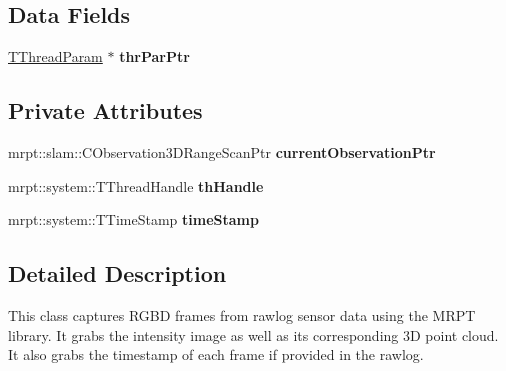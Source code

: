 \subsection*{Data Fields}
\begin{DoxyCompactItemize}
\item 
\hypertarget{class_kinect_grabber___rawlog_a7aa6e56a18c9090f2b3009ab691a4850}{
\hyperlink{struct_kinect_grabber___rawlog_1_1_t_thread_param}{TThreadParam} $\ast$ {\bfseries thrParPtr}}
\label{class_kinect_grabber___rawlog_a7aa6e56a18c9090f2b3009ab691a4850}

\end{DoxyCompactItemize}
\subsection*{Private Attributes}
\begin{DoxyCompactItemize}
\item 
\hypertarget{class_kinect_grabber___rawlog_a0f4c2d06f54de46bbe64df6435982b87}{
mrpt::slam::CObservation3DRangeScanPtr {\bfseries currentObservationPtr}}
\label{class_kinect_grabber___rawlog_a0f4c2d06f54de46bbe64df6435982b87}

\item 
\hypertarget{class_kinect_grabber___rawlog_acf419f440ab2a1c7e94a997004c066ff}{
mrpt::system::TThreadHandle {\bfseries thHandle}}
\label{class_kinect_grabber___rawlog_acf419f440ab2a1c7e94a997004c066ff}

\item 
\hypertarget{class_kinect_grabber___rawlog_a4b6bc22294bb13860292c0d5ddb7002e}{
mrpt::system::TTimeStamp {\bfseries timeStamp}}
\label{class_kinect_grabber___rawlog_a4b6bc22294bb13860292c0d5ddb7002e}

\end{DoxyCompactItemize}


\subsection{Detailed Description}
This class captures RGBD frames from rawlog sensor data using the MRPT library. It grabs the intensity image as well as its corresponding 3D point cloud. It also grabs the timestamp of each frame if provided in the rawlog. 

